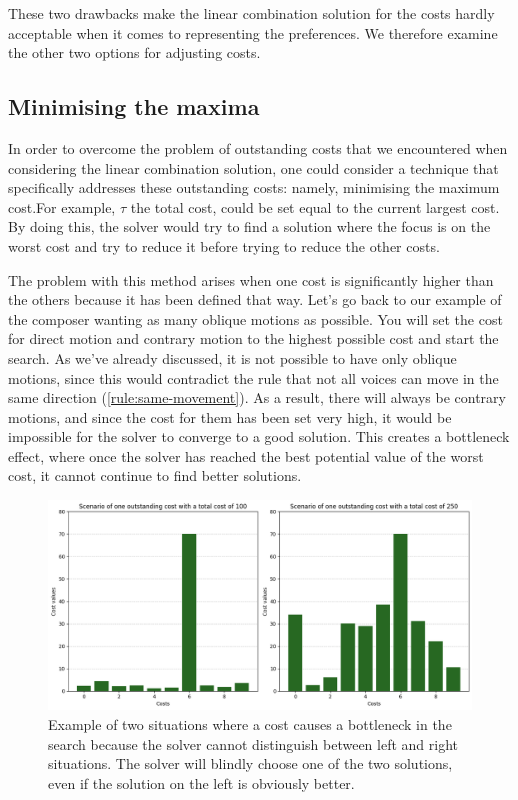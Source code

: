 These two drawbacks make the linear combination solution for the costs hardly acceptable when it comes to representing the preferences.
We therefore examine the other two options for adjusting costs.

\subsection {Minimising the maxima} \label{section:minimising-the-maxima}
In order to overcome the problem of outstanding costs that we encountered when considering the linear combination solution, one could consider a technique that specifically addresses these outstanding costs: namely, minimising the maximum cost.For example, $\tau$ the total cost, could be set equal to the current largest cost. By doing this, the solver would try to find a solution where the focus is on the worst cost and try to reduce it before trying to reduce the other costs.

The problem with this method arises when one cost is significantly higher than the others because it has been defined that way. Let's go back to our example of the composer wanting as many oblique motions as possible. You will set the cost for direct motion and contrary motion to the highest possible cost and start the search. As we've already discussed, it is not possible to have only oblique motions, since this would contradict the rule that not all voices can move in the same direction (\ref{rule:same-movement}). As a result, there will always be contrary motions, and since the cost for them has been set very high, it would be impossible for the solver to converge to a good solution. This creates a bottleneck effect, where once the solver has reached the best potential value of the worst cost, it cannot continue to find better solutions. 

\begin{figure}[h]
    \centering
    \includegraphics[width=1\textwidth]{Images/minimising-maxima.png}
    \caption{Example of two situations where a cost causes a bottleneck in the search because the solver cannot distinguish between left and right situations. The solver will blindly choose one of the two solutions, even if the solution on the left is obviously better.}
    \label{fig:bottleneck}
\end{figure}


